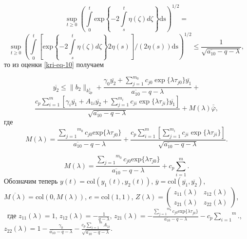 \begin{equation*}
\sup\limits_{t\ge 0}\left(\overset t{\underset 0{\int
}}\text{exp}\left\{-2\overset t{\underset s{\int }}\eta (\zeta )\mathit{d\zeta
}\right\}\text{ds}\right)^{1/2}=
\end{equation*}
\begin{equation*}
\sup\limits_{t\ge 0}\left(\overset
t{\underset 0{\int }}\left[\text{exp}\left\{-2\overset t{\underset s{\int }}\eta (\zeta )\mathit{d\zeta }\right\}2\eta
(s)\right]/(2\eta (s))\text{ds}\right)^{1/2}\le \frac 1{\sqrt{\overline{a_{10}}-q-\lambda
}},
\end{equation*}
то из оценки \eqref{kri-eq-10} получаем

\begin{equation*}  
\overline{y_2} \leq \|b_2\|_{k^1_{2p}} + \frac{\gamma_0\overline{y_2}+\sum\limits_{j=1}^{m_0} c_{j0}\exp \{\lambda\tau_{j0} \} \overline{y_1}}{\overline{a_{10}}-q-\lambda} +
\end{equation*}
\begin{equation}\label{kri-eq-11}
\frac{c_p \sum\limits_{i=1}^{m} \left[ \gamma_i\overline{y_1}+A_{1i}\overline{y_2}+\sum\limits_{j=1}^{m_i} c_{ji}\exp\{\lambda\tau_{ji} \} \overline{y_1} \right]}{\sqrt{\overline{a_{10}}-q-\lambda}} + M(\lambda)\overline{\overline{\varphi}},
\end{equation}
где 
\begin{equation*}
M(\lambda )=\frac{\overset{m_0}{\underset{j=1}{\sum }}c_{\mathit{j0}}\text{exp}\{\text{$\lambda \tau
		$}_{\mathit{j0}}\}}{\overline{a_{10}}-q-\lambda }+ \frac{c_p \sum\limits_{i=1}^{m}\left[\sum\limits_{j=1}^{m_i} c_{ji}\exp\{\lambda\tau_{ji} \}\right]}{\sqrt{\overline{a_{10}}-q-\lambda}}.
\end{equation*}

\begin{equation*}
M(\lambda )=\frac{\overset{m_0}{\underset{j=1}{\sum }}c_{\mathit{j0}}\text{exp}\{\text{$\lambda \tau
$}_{\mathit{j0}}\}}{\overline{a_{10}}-q-\lambda }+c_p\overset m{\underset{i=1}{\sum }}.
\end{equation*}
Обозначим теперь  $y(t)=\text{col}(y_1(t),y_2(t))$,  $\overline
y=\text{col}(\overline{y_1},\overline{y_2})$,  $\overline{M(\lambda
)}=\text{col}(0,M(\lambda ))$,  $e=\text{col}(1,1)$,  $Z(\lambda
)=\left(\begin{matrix}z_{11}(\lambda )&z_{12}(\lambda )\\z_{21}(\lambda )&z_{22}(\lambda )\end{matrix}\right)$, \ где
$z_{11}(\lambda )=1$,  $z_{12}(\lambda )=-\frac 1{q-\lambda }$,  $z_{21}(\lambda
)=-\frac{\overset{m_0}{\underset{j=1}{\sum }}c_{\mathit{j0}}\text{exp}\{\text{$\lambda \tau
$}_{\mathit{j0}}\}}{\overline{a_{10}}-q-\lambda }-c_p\overset m{\underset{i=1}{\sum }}.$, \  $z_{22}(\lambda
)=1-\frac{\gamma _0}{\overline{a_{10}}-q-\lambda }-\frac{c_p\overset m{\underset{i=1}{\sum
}}A_{1i}}{\sqrt{\overline{a_{10}}-q-\lambda }}.$

